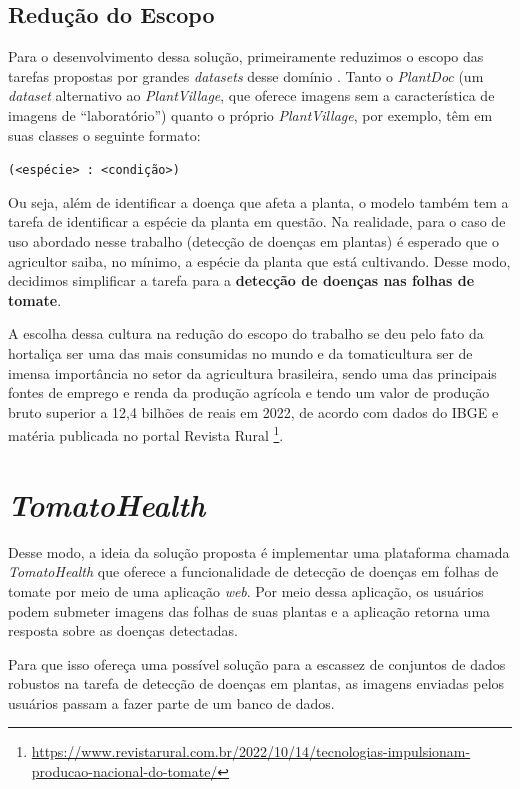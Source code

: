 \subsection{Redução do Escopo}
Para o desenvolvimento dessa solução, primeiramente reduzimos o escopo das tarefas propostas por grandes \emph{datasets} desse domínio \citep{Yao2023}. Tanto o \emph{PlantDoc} (um \emph{dataset} alternativo ao \emph{PlantVillage}, que oferece imagens sem a característica de imagens de ``laboratório'') quanto o próprio \emph{PlantVillage}, por exemplo, têm em suas classes o seguinte formato:
\begin{center}
    \texttt{(<espécie> : <condição>)}
\end{center}
Ou seja, além de identificar a doença que afeta a planta, o modelo também tem a tarefa de identificar a espécie da planta em questão. Na realidade, para o caso de uso abordado nesse trabalho (detecção de doenças em plantas) é esperado que o agricultor saiba, no mínimo, a espécie da planta que está cultivando. Desse modo, decidimos simplificar a tarefa para a {\bf detecção de doenças nas folhas de tomate}.

A escolha dessa cultura na redução do escopo do trabalho se deu pelo fato da hortaliça ser uma das mais consumidas no mundo e da tomaticultura ser de imensa importância no setor da agricultura brasileira, sendo uma das principais fontes de emprego e renda da produção agrícola e tendo um valor de produção bruto superior a 12,4 bilhões de reais em 2022, de acordo com dados do IBGE e matéria publicada no portal Revista Rural \footnote{\url{https://www.revistarural.com.br/2022/10/14/tecnologias-impulsionam-producao-nacional-do-tomate/}}.

\section{\emph{TomatoHealth}}
Desse modo, a ideia da solução proposta é implementar uma plataforma chamada \emph{TomatoHealth} que oferece a funcionalidade de detecção de doenças em folhas de tomate por meio de uma aplicação \emph{web}. Por meio dessa aplicação, os usuários podem submeter imagens das folhas de suas plantas e a aplicação retorna uma resposta sobre as doenças detectadas.

Para que isso ofereça uma possível solução para a escassez de conjuntos de dados robustos na tarefa de detecção de doenças em plantas, as imagens enviadas pelos usuários passam a fazer parte de um banco de dados. 

